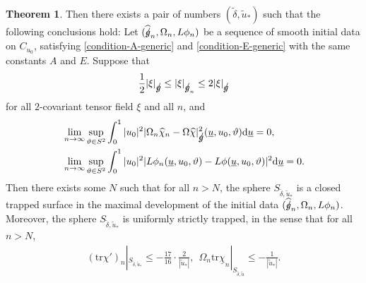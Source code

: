 \documentclass[11pt,reqno]{amsart}
\theoremstyle{definition}
\newtheorem{theorem}{Theorem}[section]
\numberwithin{equation}{section}
\newcommand{\D}{\mathrm{d}}
\newcommand{\tr}{\mathrm{tr}}
\def\chib{\underline{\chi}}
\def\chih{\widehat{\chi}}
\def\tr{\mathrm{tr}}
\def\ub{\underline{u}}
\newcommand{\tdelta}{\widetilde{\delta}}
\newcommand{\tu}{\widetilde{u}}
\def\gs{\mbox{$g \mkern -9mu /$}}
\begin{document}
\begin{theorem}
Then there exists a pair of numbers $(\tdelta, \tu_*)$ such that the following conclusions hold: Let $(\widehat{\gs}_n, \Omega_n, L\phi_n)$ be a sequence of smooth initial data on $C_{u_0}$, satisfying \eqref{condition-A-generic} and \eqref{condition-E-generic} with the same constants $A$ and $E$. Suppose that
\begin{align*}
\frac{1}{2}|\xi|_{\gs}\le|\xi|_{\gs_n}\le 2|\xi|_{\gs}
\end{align*}
for all $2$-covariant tensor field $\xi$ and all $n$, and
\begin{align}
&\label{converge-chihn}\lim_{n\to\infty}\sup_{\vartheta\in S^2}\int_0^{1}|u_0|^2|\Omega_n\chih_n-\Omega\chih|_{\gs}^2(\ub,u_0,\vartheta)\D\ub=0,\\
&\label{converge-Lphin}\lim_{n\to\infty}\sup_{\vartheta\in S^2}\int_0^{1}|u_0|^2|L\phi_n(\ub,u_0,\vartheta)-L\phi(\ub,u_0,\vartheta)|^2\D\ub=0.
\end{align}
Then there exists some $N$ such that for all $n>N$, the sphere $S_{\tdelta, \tu_*}$ is a closed trapped surface in the maximal development of the initial data $(\widehat{\gs}_n, \Omega_n, L\phi_n)$. Moreover, the sphere $S_{\tdelta,\tu_*}$ is uniformly strictly trapped, in the sense that for all $n>N$,
\begin{align*}
(\tr\chi')_n|_{S_{\tdelta,\tu_*}}\le-\frac{17}{16}\cdot\frac{2}{|\tu_*|}, \ \ \Omega_n\tr\chib_n|_{S_{\tdelta,\tu}}\le-\frac{1}{|\tu_*|}.
\end{align*}
\end{theorem}
\end{document}

